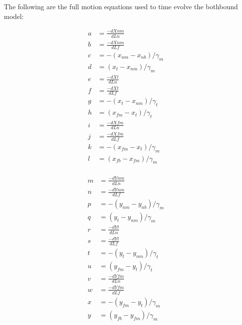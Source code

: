 \documentclass[
11pt, %
english, %
singlespacing, %
headsepline, %
chapterinoneline, %
]{MastersDoctoralThesis} %
\begin{document}
The following are the full motion equations used to time evolve the bothbound model:

\begin{center}
  \begin{minipage}{0.3\textwidth}
    \begin{align*}
      a &= \frac{-dXnm}{dLn}\\
       b &= \frac{-dXnm}{dLf}\\
       c &= -(x_{nm} - x_{nb}) / \gamma_m\\
       d &= (x_t - x_{nm}) / \gamma_m\\
       e &= \frac{-dXt}{dLn}\\
       f &= \frac{-dXt}{dLf}\\
       g &= -(x_t - x_{nm}) / \gamma_t\\
       h &= (x_{fm} - x_t) / \gamma_t\\
       i &= \frac{-dXfm}{dLn}\\
       j &= \frac{-dXfm}{dLf}\\
       k &= -(x_{fm} - x_t) / \gamma_m\\
       l &= (x_{fb} - x_{fm}) / \gamma_m\\
    \end{align*}
  \end{minipage}
  \begin{minipage}{0.3\textwidth}
    \begin{align*}
       m &= \frac{-dYnm}{dLn}\\
       n &= \frac{-dYnm}{dLf}\\
       p &= -(y_{nm} - y_{nb}) / \gamma_m\\
       q &= (y_t - y_{nm}) / \gamma_m\\
       r &= \frac{-dYt}{dLn}\\
       s &= \frac{-dYt}{dLf}\\
       t &= -(y_t - y_{nm}) / \gamma_t\\
       u &= (y_{fm} - y_t) / \gamma_t\\
       v &= \frac{-dYfm}{dLn}\\
       w &= \frac{-dYfm}{dLf}\\
       x &= -(y_{fm} - y_t) / \gamma_m\\
       y &= (y_{fb} - y_{fm}) / \gamma_m
    \end{align*}
  \end{minipage}
\end{center}
%
\end{document}
